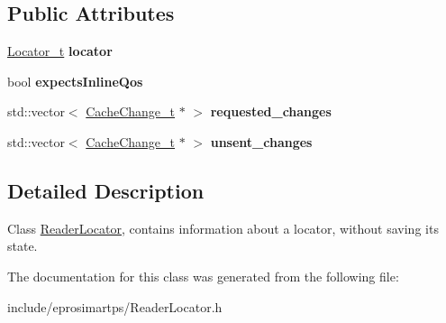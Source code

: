 \subsection*{\-Public \-Attributes}
\begin{DoxyCompactItemize}
\item 
\hypertarget{classeprosima_1_1rtps_1_1_reader_locator_a5c0c293feae17fa189d5fddb151223a3}{\hyperlink{structeprosima_1_1rtps_1_1_locator__t}{\-Locator\-\_\-t} {\bfseries locator}}\label{classeprosima_1_1rtps_1_1_reader_locator_a5c0c293feae17fa189d5fddb151223a3}

\item 
\hypertarget{classeprosima_1_1rtps_1_1_reader_locator_a78b56d42526f78e9408472c922499f97}{bool {\bfseries expects\-Inline\-Qos}}\label{classeprosima_1_1rtps_1_1_reader_locator_a78b56d42526f78e9408472c922499f97}

\item 
\hypertarget{classeprosima_1_1rtps_1_1_reader_locator_a0d060d2826b68ed9438199466fca43c6}{std\-::vector$<$ \hyperlink{structeprosima_1_1rtps_1_1_cache_change__t}{\-Cache\-Change\-\_\-t} $\ast$ $>$ {\bfseries requested\-\_\-changes}}\label{classeprosima_1_1rtps_1_1_reader_locator_a0d060d2826b68ed9438199466fca43c6}

\item 
\hypertarget{classeprosima_1_1rtps_1_1_reader_locator_a8ccc5ac7af4fb5ccf47acff133d9f626}{std\-::vector$<$ \hyperlink{structeprosima_1_1rtps_1_1_cache_change__t}{\-Cache\-Change\-\_\-t} $\ast$ $>$ {\bfseries unsent\-\_\-changes}}\label{classeprosima_1_1rtps_1_1_reader_locator_a8ccc5ac7af4fb5ccf47acff133d9f626}

\end{DoxyCompactItemize}


\subsection{\-Detailed \-Description}
\-Class \hyperlink{classeprosima_1_1rtps_1_1_reader_locator}{\-Reader\-Locator}, contains information about a locator, without saving its state. 

\-The documentation for this class was generated from the following file\-:\begin{DoxyCompactItemize}
\item 
include/eprosimartps/\-Reader\-Locator.\-h\end{DoxyCompactItemize}

